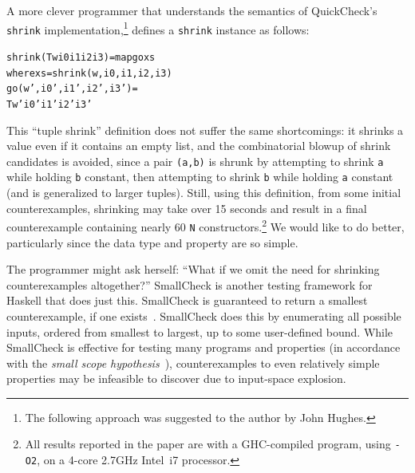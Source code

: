 \documentclass{sigplanconf}
\newenvironment{code}{\begin{alltt}}{\end{alltt}}
\newcommand{\ttp}[1]{\texttt{#1}}
\begin{document}
A more clever programmer that understands the semantics of QuickCheck's
\ttp{shrink} implementation,\footnote{The following approach was suggested to
  the author by John Hughes.} defines a \ttp{shrink} instance as follows:
%
\begin{code}
shrink (T w i0 i1 i2 i3) = map go xs
  where xs = shrink (w, i0, i1, i2, i3)
        go (w', i0', i1', i2', i3') =
          T w' i0' i1' i2' i3'
\end{code}
%
\noindent
This ``tuple shrink'' definition does not suffer the same shortcomings: it
shrinks a value even if it contains an empty list, and the combinatorial blowup
of shrink candidates is avoided, since a pair \ttp{(a,b)} is shrunk by
attempting to shrink \ttp{a} while holding \ttp{b} constant, then attempting to
shrink \ttp{b} while holding \ttp{a} constant (and is generalized to larger
tuples).  Still, using this definition, from some initial counterexamples,
shrinking may take over 15 seconds and result in a final counterexample
containing nearly 60 \ttp{N} constructors.\footnote{All results reported in the paper
  are with a GHC-compiled program, using \ttp{-O2}, on a 4-core 2.7GHz Intel~i7
  processor.}  We would like to do better, particularly since the data type and
property are so simple.

The programmer might ask herself: ``What if we omit the need for shrinking
counterexamples altogether?''  SmallCheck is another testing framework for
Haskell that does just this.  SmallCheck is guaranteed to return a smallest
counterexample, if one exists~\cite{sc}.  SmallCheck does this by enumerating
all possible inputs, ordered from smallest to largest, up to some user-defined
bound.  While SmallCheck is effective for testing many programs and properties
(in accordance with the \emph{small scope hypothesis}~\cite{jackson}),
counterexamples to even relatively simple properties may be infeasible to
discover due to input-space explosion.


\end{document}

